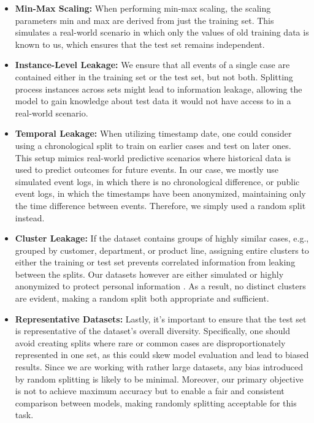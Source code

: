 \begin{itemize}
\item \textbf{Min-Max Scaling:}  
When performing min-max scaling,
the scaling parameters min and max are derived from just the training set.
This simulates a real-world scenario in which only the values of old training data is known to us,
which ensures that the test set remains independent.
\item \textbf{Instance-Level Leakage:}  
We ensure that all events of a single case are contained either in the training set or the test set, but not both.
Splitting process instances across sets might lead to information leakage,
allowing the model to gain knowledge about test data it would not have access to in a real-world scenario.
\item \textbf{Temporal Leakage:}  
When utilizing timestamp date, one could consider using a chronological split to train on earlier cases and test on later ones.
This setup mimics real-world predictive scenarios where historical data is used to predict outcomes for future events.
In our case, we mostly use simulated event logs, in which there is no chronological difference,
or public event logs, in which the timestamps have been anonymized,
maintaining only the time difference between events. \cite{hospital_billing}
Therefore, we simply used a random split instead.
\item \textbf{Cluster Leakage:}  
If the dataset contains groups of highly similar cases, e.g., grouped by customer, department, or product line,
assigning entire clusters to either the training or test set prevents correlated information from leaking between the splits.
Our datasets however are either simulated or highly anonymized to protect personal information \cite{hospital_billing}.
As a result, no distinct clusters are evident, making a random split both appropriate and sufficient.
\item \textbf{Representative Datasets:}  
Lastly, it's important to ensure that the test set is representative of the dataset's overall diversity.
Specifically, one should avoid creating splits where rare or common cases are disproportionately represented in one set,
as this could skew model evaluation and lead to biased results.
Since we are working with rather large datasets, any bias introduced by random splitting is likely to be minimal.
Moreover, our primary objective is not to achieve maximum accuracy but to enable a fair and consistent comparison between models,
making randomly splitting acceptable for this task.
\end{itemize}

